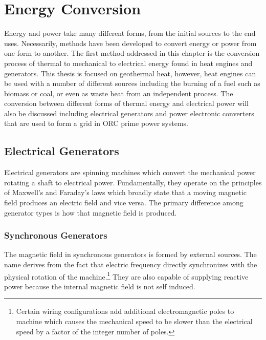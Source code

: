 \chapter{Energy Conversion}
\label{ch:conv}

Energy and power take many different forms, from the initial sources to the end uses. Necessarily, methods have been developed to convert energy or power from one form to another. The first method addressed in this chapter is the conversion process of thermal to mechanical to electrical energy found in heat engines and generators. This thesis is focused on geothermal heat, however, heat engines can be used with a number of different sources including the burning of a fuel such as biomass or coal, or even as waste heat from an independent process. The conversion between different forms of thermal energy and electrical power will also be discussed including electrical generators and power electronic converters that are used to form a grid in ORC prime power systems.



\section{Electrical Generators}
Electrical generators are spinning machines which convert the mechanical power rotating a shaft to electrical power. Fundamentally, they operate on the principles of Maxwell's and Faraday's laws which broadly state that a moving magnetic field produces an electric field and vice versa. The primary difference among generator types is how that magnetic field is produced. 

\subsection{Synchronous Generators}
The magnetic field in synchronous generators is formed by external sources. The name derives from the fact that electric frequency directly synchronizes with the physical rotation of the machine.\footnote{Certain wiring configurations add additional electromagnetic poles to machine which causes the mechanical speed to be slower than the electrical speed by a factor of the integer number of poles.} They are also capable of supplying reactive power because the internal magnetic field is not self induced. 

